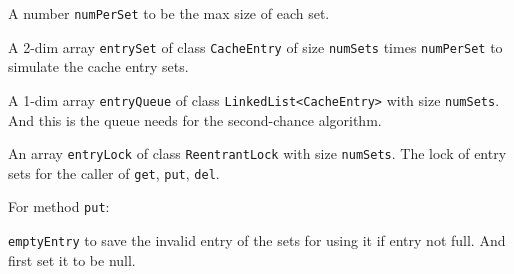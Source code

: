 \documentclass{article}
\begin{document}
A number \texttt{numPerSet} to be the max size of each set.

A 2-dim array \texttt{entrySet} of class \texttt{CacheEntry} of size \texttt{numSets} times \texttt{numPerSet} to simulate the cache entry sets.

A 1-dim array \texttt{entryQueue} of class \texttt{LinkedList<CacheEntry>} with size \texttt{numSets}. And this is the queue needs for the second-chance algorithm.

An array \texttt{entryLock} of class \texttt{ReentrantLock} with size \texttt{numSets}. The lock of entry sets for the caller of \texttt{get}, \texttt{put}, \texttt{del}.

For method \texttt{put}:
\begin{compactitem}
\item \texttt{emptyEntry} to save the invalid entry of the sets for using it if entry not full. And first set it to be null.
\end{compactitem}
\end{document}

